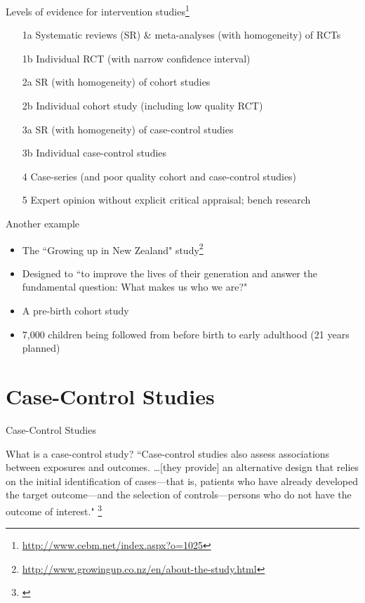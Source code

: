 \documentclass{beamer}
\begin{document}
\begin{frame}{Levels of evidence for intervention studies\footnote{\tiny{\url{http://www.cebm.net/index.aspx?o=1025}}}}
	\begin{itemize}
	\item[1a] Systematic reviews (SR) \& meta-analyses (with homogeneity) of RCTs
	\item[1b] Individual RCT (with narrow confidence interval)  
	\item[2a] \alert{SR (with homogeneity) of cohort studies}
	\item[2b] \alert{Individual cohort study (including low quality RCT)}
	\item[3a] SR (with homogeneity) of case-control studies
	\item[3b] Individual case-control studies
	\item[4] Case-series (and poor quality cohort and case-control studies)
	\item[5] Expert opinion without explicit critical appraisal; bench research
	\end{itemize}
\end{frame}

\begin{frame}{Another example}
	\begin{itemize}
	\item The ``Growing up in New Zealand" study\footnote{\tiny{\url{http://www.growingup.co.nz/en/about-the-study.html}}}
	\item Designed to ``to improve the lives of their generation and answer the fundamental question: What makes us who we are?"
	\item A pre-birth cohort study
	\item 7,000 children being followed from before birth to early adulthood (21 years planned)
	\end{itemize}
\end{frame}

\section{Case-Control Studies}

\begin{frame}
\begin{center}
\Huge{Case-Control Studies}
\end{center}
\end{frame}

\begin{frame}{What is a case-control study?}
``Case-control studies also assess associations between exposures and outcomes. \dots [they provide] an alternative design that relies on the initial identification of \alert{cases}---that is, patients who have already developed the target outcome---and the selection of \alert{controls}---persons who do not have the outcome of interest."
\footnote{\tiny{\citet[p. 146]{Guyatt2008d}}}

\end{frame}
\end{document}
